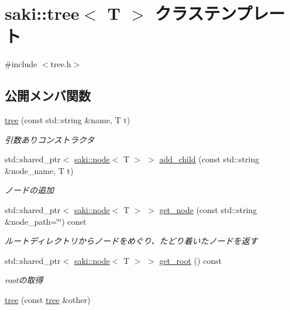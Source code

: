 \hypertarget{classsaki_1_1tree}{}\section{saki\+:\+:tree$<$ T $>$ クラステンプレート}
\label{classsaki_1_1tree}


{\ttfamily \#include $<$tree.\+h$>$}

\subsection*{公開メンバ関数}
\begin{DoxyCompactItemize}
\item 
\mbox{\hyperlink{classsaki_1_1tree_a43b93f5855c1def3b61018344d14e809}{tree}} (const std\+::string \&name, T t)
\begin{DoxyCompactList}\small\item\em 引数ありコンストラクタ \end{DoxyCompactList}\item 
std\+::shared\+\_\+ptr$<$ \mbox{\hyperlink{classsaki_1_1node}{saki\+::node}}$<$ T $>$ $>$ \mbox{\hyperlink{classsaki_1_1tree_a075bd07afce11ff91ffa6d200dbf6282}{add\+\_\+child}} (const std\+::string \&node\+\_\+name, T t)
\begin{DoxyCompactList}\small\item\em ノードの追加 \end{DoxyCompactList}\item 
std\+::shared\+\_\+ptr$<$ \mbox{\hyperlink{classsaki_1_1node}{saki\+::node}}$<$ T $>$ $>$ \mbox{\hyperlink{classsaki_1_1tree_a796564f1228f24be4bda5f1f82ba44c3}{get\+\_\+node}} (const std\+::string \&node\+\_\+path=\char`\"{}\char`\"{}) const
\begin{DoxyCompactList}\small\item\em ルートディレクトリからノードをめぐり、たどり着いたノードを返す \end{DoxyCompactList}\item 
std\+::shared\+\_\+ptr$<$ \mbox{\hyperlink{classsaki_1_1node}{saki\+::node}}$<$ T $>$ $>$ \mbox{\hyperlink{classsaki_1_1tree_a6e1fd64555848330aa28f3273953abbb}{get\+\_\+root}} () const
\begin{DoxyCompactList}\small\item\em rootの取得 \end{DoxyCompactList}\item 
\mbox{\hyperlink{classsaki_1_1tree_ade3fa86e8bd2b2d22b3ec7da24f915b6}{tree}} (const \mbox{\hyperlink{classsaki_1_1tree}{tree}} \&other)

\end{DoxyCompactItemize}
